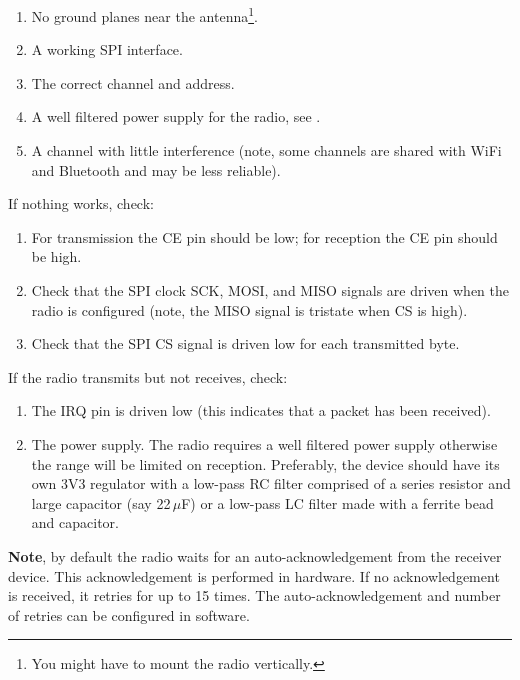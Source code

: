 \begin{enumerate}
\item No ground planes near the antenna\footnote{You might have to
  mount the radio vertically.}.

\item A working SPI interface.

\item The correct channel and address.

\item A well filtered power supply for the radio, see .

\item A channel with little interference (note, some channels are
  shared with WiFi and Bluetooth and may be less reliable).
\end{enumerate}

If nothing works, check:

\begin{enumerate}
\item
  For transmission the CE pin should be low; for reception the CE pin
  should be high.
\item
  Check that the SPI clock SCK, MOSI, and MISO signals are driven when
  the radio is configured (note, the MISO signal is tristate when CS is
  high).
\item
  Check that the SPI CS signal is driven low for each transmitted byte.
\end{enumerate}

If the radio transmits but not receives, check:

\begin{enumerate}
\item
  The IRQ pin is driven low (this indicates that a packet has been
  received).
\item
  The power supply. The radio requires a well filtered power supply
  otherwise the range will be limited on reception. Preferably, the
  device should have its own 3V3 regulator with a low-pass RC filter
  comprised of a series resistor and large capacitor (say 22\,$\mu$F)
  or a low-pass LC filter made with a ferrite bead and capacitor.
\end{enumerate}

\textbf{Note}, by default the radio waits for an auto-acknowledgement
from the receiver device. This acknowledgement is performed in hardware.
If no acknowledgement is received, it retries for up to 15 times. The
auto-acknowledgement and number of retries can be configured in
software.


